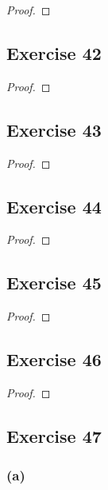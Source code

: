 \documentclass[14pt]{extarticle}
\begin{document}
\begin{proof}

\end{proof}

\subsection{Exercise 42}

\begin{proof}

\end{proof}

\subsection{Exercise 43}

\begin{proof}

\end{proof}

\subsection{Exercise 44}

\begin{proof}

\end{proof}

\subsection{Exercise 45}

\begin{proof}

\end{proof}

\subsection{Exercise 46}

\begin{proof}

\end{proof}

\subsection{Exercise 47}

\subsubsection{(a)}
\end{document}
